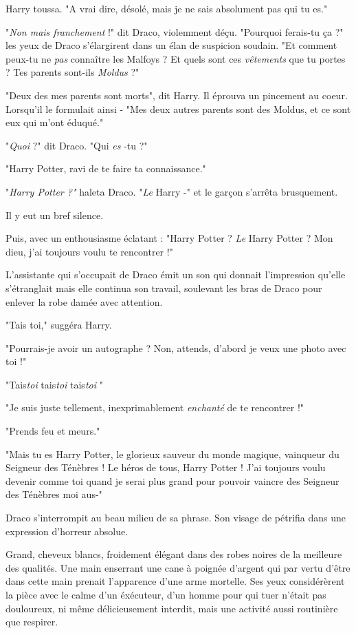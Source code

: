 Harry toussa. "A vrai dire, désolé, mais je ne sais absolument pas qui tu es."

"\emph{Non mais franchement}  !" dit Draco, violemment déçu. "Pourquoi ferais-tu ça ?" les yeux de Draco s'élargirent dans un élan de suspicion soudain. "Et comment peux-tu ne \emph{pas}  connaître les Malfoys ? Et quels sont ces \emph{vêtements } que tu portes ? Tes parents sont-ils \emph{Moldus}  ?"

"Deux des mes parents sont morts", dit Harry. Il éprouva un pincement au coeur. Lorsqu'il le formulait ainsi - "Mes deux autres parents sont des Moldus, et ce sont eux qui m'ont éduqué."

"\emph{Quoi}  ?" dit Draco. "Qui \emph{es} -tu ?"

"Harry Potter, ravi de te faire ta connaissance."

"\emph{Harry Potter ?"}  haleta Draco. "\emph{Le}  Harry -" et le garçon s'arrêta brusquement.

Il y eut un bref silence.

Puis, avec un enthousiasme éclatant : "Harry Potter ? \emph{Le}  Harry Potter ? Mon dieu, j'ai toujours voulu te rencontrer !"

L'assistante qui s'occupait de Draco émit un son qui donnait l'impression qu'elle s'étranglait mais elle continua son travail, soulevant les bras de Draco pour enlever la robe damée avec attention.

"Tais toi," suggéra Harry.

"Pourrais-je avoir un autographe ? Non, attends, d'abord je veux une photo avec toi !"

"Tais\emph{toi} tais\emph{toi} tais\emph{toi} "

"Je suis juste tellement, inexprimablement \emph{enchanté}  de te rencontrer !"

"Prends feu et meurs."

"Mais tu es Harry Potter, le glorieux sauveur du monde magique, vainqueur du Seigneur des Ténèbres ! Le héros de tous, Harry Potter ! J'ai toujours voulu devenir comme toi quand je serai plus grand pour pouvoir vaincre des Seigneur des Ténèbres moi aus-"

Draco s'interrompit au beau milieu de sa phrase. Son visage de pétrifia dans une expression d'horreur absolue.

Grand, cheveux blancs, froidement élégant dans des robes noires de la meilleure des qualités. Une main enserrant une cane à poignée d'argent qui par vertu d'être dans cette main prenait l'apparence d'une arme mortelle. Ses yeux considérèrent la pièce avec le calme d'un éxécuteur, d'un homme pour qui tuer n'était pas douloureux, ni même délicieusement interdit, mais une activité aussi routinière que respirer.

